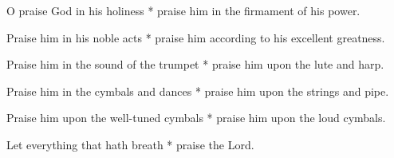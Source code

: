 \begin{multicols}{2}
	
	O praise God in his holiness * praise him in the firmament of his power.
	
	Praise him in his noble acts * praise him according to his excellent greatness.
	
	Praise him in the sound of the trumpet * praise him upon the lute and harp.
	
	Praise him in the cymbals and dances * praise him upon the strings and pipe.
	
	Praise him upon the well-tuned cymbals * praise him upon the loud cymbals.
	
	Let everything that hath breath * praise the Lord.
	
	\gloria{}
\end{multicols}